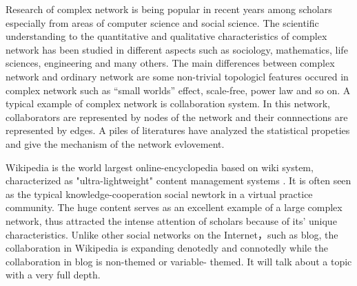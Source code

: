 \documentclass{elsarticle}
\begin{document}
Research of complex network is being popular in recent years among scholars
especially from areas of computer science and social science.
 The scientific understanding to the quantitative and
qualitative characteristics of complex network has been studied in
different aspects such as sociology, mathematics, life sciences,
engineering and many others. The main differences between complex
network and ordinary network are  some non-trivial
topologicl features occured in complex network such as “small worlds” effect\cite{Watts2003}, scale-free\cite{PhysRevLett.90.058701},
power law\cite{wang2003cns} and so on. A typical example of complex network is collaboration system. In this network, collaborators are represented by nodes of the network
and their connnections are represented by edges. A piles of literatures
have analyzed the statistical propeties\cite{albert-2002-74,dorogovtsev2002en,pastorsatorras2004eas} and give the mechanism of
the network evlovement.



Wikipedia is the world largest online-encyclopedia based on wiki
system,  characterized as "ultra-lightweight" content management systems
\cite{mattison2003qst}. It is often seen as the typical
knowledge-cooperation social newtork in a  virtual
practice community. The huge content serves as an excellent example of
a large complex network\cite{Barabasi2003}, thus attracted the intense attention of scholars
because of its' unique characteristics. Unlike other social networks on the
Internet，such as blog,  the
collaboration in Wikipedia is expanding denotedly and connotedly while the collaboration in blog is non-themed or variable- themed. It will talk about a topic with a very full depth\cite{Sauer2005}.
\end{document}
